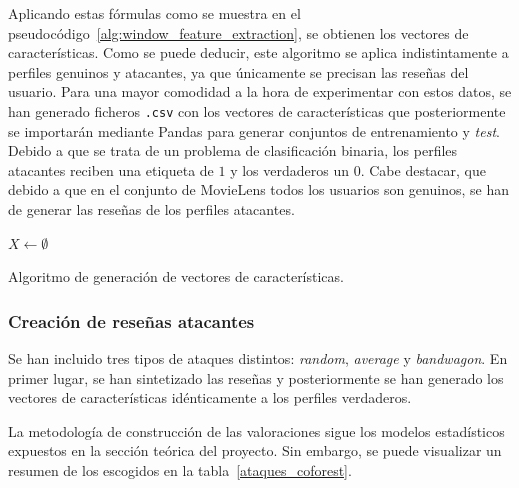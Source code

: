 Aplicando estas fórmulas como se muestra en el pseudocódigo~\ref{alg:window_feature_extraction}, se obtienen los vectores de características. Como se puede deducir, este algoritmo se aplica indistintamente a perfiles genuinos y atacantes, ya que únicamente se precisan las reseñas del usuario. Para una mayor comodidad a la hora de experimentar con estos datos, se han generado ficheros \texttt{.csv} con los vectores de características que posteriormente se importarán mediante Pandas para generar conjuntos de entrenamiento y \textit{test}. Debido a que se trata de un problema de clasificación binaria, los perfiles atacantes reciben una etiqueta de $1$ y los verdaderos un $0$. Cabe destacar, que debido a que en el conjunto de MovieLens todos los usuarios son genuinos, se han de generar las reseñas de los perfiles atacantes. 

\begin{algorithm}
	\BlankLine
	$X \leftarrow \emptyset$\\
	\caption{Algoritmo de generación de vectores de características.}
	\label{alg:window_feature_extraction}
\end{algorithm}


\subsubsection{Creación de reseñas atacantes}

Se han incluido tres tipos de ataques distintos: \textit{random}, \textit{average} y \textit{bandwagon}. En primer lugar, se han sintetizado las reseñas y posteriormente se han generado los vectores de características idénticamente a los perfiles verdaderos.

La metodología de construcción de las valoraciones sigue los modelos estadísticos expuestos en la sección teórica del proyecto. Sin embargo, se puede visualizar un resumen de los escogidos en la tabla~\ref{ataques_coforest}.

